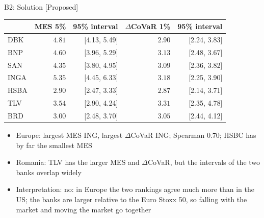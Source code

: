 \ifsolutions
\begin{frame}{B2: Solution [Proposed]}
\itemsize{\footnotesize}
\begin{center}
\scriptsize
\begin{tabular}{lrrrr}
\toprule
& MES 5\% & 95\% interval & $\Delta$CoVaR 1\% & 95\% interval \\
\midrule
DBK & $4.81$ & [4.13, 5.49] & $2.90$ & [2.24, 3.83] \\
BNP & $4.60$ & [3.96, 5.29] & $3.13$ & [2.48, 3.67] \\
SAN & $4.35$ & [3.80, 4.95] & $3.09$ & [2.36, 3.82] \\
INGA & $5.35$ & [4.45, 6.33] & $3.18$ & [2.25, 3.90] \\
HSBA & $2.90$ & [2.47, 3.33] & $2.87$ & [2.14, 3.71] \\
\midrule
TLV & $3.54$ & [2.90, 4.24] & $3.31$ & [2.35, 4.78] \\
BRD & $3.00$ & [2.48, 3.70] & $3.05$ & [2.44, 4.12] \\
\bottomrule
\end{tabular}
\end{center}
\begin{itemize}
    \item Europe: largest MES ING, largest $\Delta$CoVaR ING; Spearman $0.70$; HSBC has by far the smallest MES
    \item Romania: TLV has the larger MES and $\Delta$CoVaR, but the intervals of the two banks overlap widely
    \item Interpretation: no: in Europe the two rankings agree much more than in the US; the banks are larger relative to the Euro Stoxx 50, so falling with the market and moving the market go together
\end{itemize}
\end{frame}
\fi

